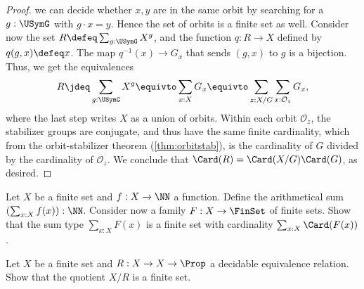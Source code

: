 \begin{proof}
  we can decide whether $x,y$ are in the same orbit by searching
  for a $g : \USymG$ with $g\cdot x = y$.
  Hence the set of orbits is a finite set as well.
  Consider now the set $R \defeq \sum_{g:\USymG} X^g$,
  and the function $q : R \to X$
  defined by $q(g,x) \defeq x$.
  The map $q^{-1}(x) \to G_x$ that sends $(g,x)$ to $g$ is a bijection.
  Thus, we get the equivalences
  \[
    R \jdeq \sum_{g:\USymG} X^g \equivto \sum_{x:X} G_x
    \equivto \sum_{z:X/G} \sum_{x : \mathcal O_z} G_x,
  \]
  where the last step writes $X$ as a union of orbits.
  Within each orbit $\mathcal O_z$,
  the stabilizer groups are conjugate,
  and thus have the same finite cardinality,
  which from the orbit-stabilizer theorem (\cref{thm:orbitstab}),
  is the cardinality of $G$ divided by the cardinality of $\mathcal O_z$.
  We conclude that $\Card(R) = \Card(X/G)\Card(G)$, as desired.
\end{proof}

\begin{xca}\label{xca:sum-over-finite-set}
Let $X$ be a finite set and $f:X\to\NN$ a function.
Define the arithmetical sum $(\sum_{x:X} f(x)):\NN$.
Consider now a family $F: X\to\FinSet$ of finite sets. Show that the sum type
$\sum_{x:X}F(x)$ is a finite set with cardinality $\sum_{x:X} \Card(F(x))$.
\end{xca}

\begin{xca}\label{xca:dec-quot-finite-set}
Let $X$ be a finite set and $R:X\to X\to\Prop$ a decidable
equivalence relation. Show that the quotient $X/R$ is a finite set.
\end{xca}

